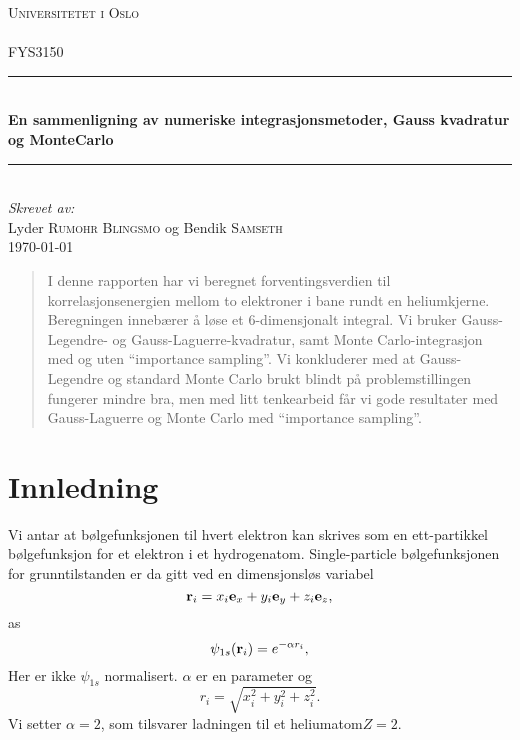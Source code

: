 \documentclass[11pt]{article}
\begin{document}
\begin{titlepage}
  \newcommand{\HRule}{\rule{\linewidth}{0.5mm}}
  \center
  \textsc{\LARGE Universitetet i Oslo}\\[1.5cm] %
  \textsc{\Large }\\[0.5cm] %
  \textsc{\large FYS3150}\\[0.5cm] %
  \HRule \\[0.4cm]
  { \huge \bfseries En sammenligning av numeriske integrasjonsmetoder, Gauss kvadratur og MonteCarlo}\\[0.4cm] %
  \HRule \\[1.5cm]
  \Large \emph{Skrevet av:}\\
  Lyder \textsc{Rumohr Blingsmo} og Bendik \textsc{Samseth}\\[3cm]
  {\large \today}\\[3cm]
  \vfill
\end{titlepage}

\begin{abstract}
  I denne rapporten har vi beregnet forventingsverdien til korrelasjonsenergien
  mellom to elektroner i bane rundt en heliumkjerne. Beregningen
  innebærer å løse et 6-dimensjonalt integral. Vi bruker
  Gauss-Legendre- og Gauss-Laguerre-kvadratur, samt
  Monte Carlo-integrasjon med og uten ``importance sampling''. Vi
  konkluderer med at Gauss-Legendre og standard Monte Carlo brukt
  blindt på problemstillingen fungerer mindre bra, men med litt
  tenkearbeid får vi gode resultater med Gauss-Laguerre og Monte Carlo
  med ``importance sampling''.  
\end{abstract}

\section{Innledning}

Vi antar at bølgefunksjonen til hvert elektron kan skrives som en ett-partikkel
bølgefunksjon for et elektron i et hydrogenatom. Single-particle bølgefunksjonen for 
grunntilstanden er da gitt ved en dimensjonsløs variabel
\[
   {\bf r}_i =  x_i {\bf e}_x + y_i {\bf e}_y +z_i {\bf e}_z ,
\]
as
\[
   \psi_{1s}({\bf r}_i)  =   e^{-\alpha r_i},
\]
Her er ikke $\psi_{1s}$ normalisert. $\alpha$ er en parameter og
\[
r_i = \sqrt{x_i^2+y_i^2+z_i^2}.
\]
Vi setter $\alpha=2$, som tilsvarer ladningen til et heliumatom$Z=2$. 
\end{document}

